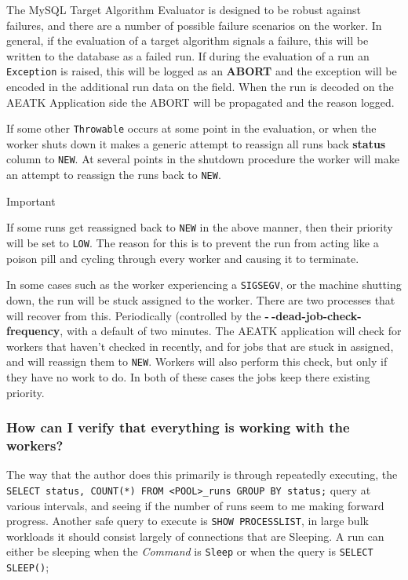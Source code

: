 \documentclass[11pt,letterpaper,oneside]{article}
\begin{document}
The MySQL Target Algorithm Evaluator is designed to be robust against failures, and there are a number of possible failure scenarios on the worker. In general, if the evaluation of a target algorithm signals a failure, this will be written to the database as a failed run.  If during the evaluation of a run an \texttt{Exception} is raised, this will be logged as an \textbf{ABORT} and the exception will be encoded in the additional run data on the field. When the run is decoded on the AEATK Application side the ABORT will be propagated and the reason logged.

If some other \texttt{Throwable} occurs at some point in the evaluation, or when the worker shuts down it makes a generic attempt to reassign all runs back \textbf{status} column to \texttt{NEW}. At several points in the shutdown procedure the worker will make an attempt to reassign the runs back to \texttt{NEW}.

\begin{bclogo}[logo=\bcattention, couleurBarre=red, noborder=true]{Important}

If some runs get reassigned back to \texttt{NEW} in the above manner, then their priority will be set to \texttt{LOW}. The reason for this is to prevent the run from acting like a poison pill and cycling through every worker and causing it to terminate.

\end{bclogo}

In some cases such as the worker experiencing a \texttt{SIGSEGV}, or the machine shutting down, the run will be stuck assigned to the worker. There are two processes that will recover from this. Periodically (controlled by the \textbf{-$~\!$-dead-job-check-frequency}, with a default of two minutes. The AEATK application will check for workers that haven't checked in recently, and for jobs that are stuck in assigned, and will reassign them to \texttt{NEW}. Workers will also perform this check, but only if they have no work to do. In both of these cases the jobs keep there existing priority.

\subsubsection{How can I verify that everything is working with the workers?}
\label{working-workers}
The way that the author does this primarily is through repeatedly executing, the \texttt{SELECT status, COUNT(*) FROM <POOL>\_runs GROUP BY status;} query at various intervals, and seeing if the number of runs seem to me making forward progress. Another safe query to execute is \texttt{SHOW PROCESSLIST}, in large bulk workloads it should consist largely of connections that are Sleeping.  A run can either be sleeping when the \textit{Command} is \texttt{Sleep} or when the query is \texttt{SELECT SLEEP()};
\end{document}
